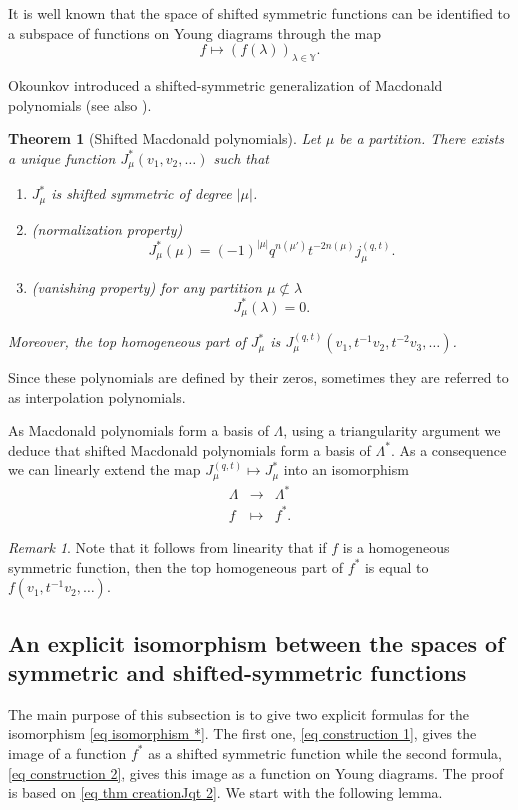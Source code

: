\documentclass[12pt]{amsart}
\newtheorem{thm}{Theorem}[section]
\theoremstyle{remark}
\newtheorem{rmq}{Remark}
\newcommand{\J}{{J}^{(q,t)}}
\newcommand{\Jsh}{{J}^{*}}
\newcommand{\normJ}{{j}^{(q,t)}}
\begin{document}
It is well known that the space of shifted symmetric functions can be identified to a subspace of functions on Young diagrams through the map
$$f\longmapsto (f(\lambda))_{\lambda\in\mathbb Y}.$$ 

Okounkov introduced a shifted-symmetric generalization of Macdonald polynomials (see also \cite{Knop1997b,Sahi1996}).
\begin{thm}[Shifted Macdonald polynomials]\cite{Okounkov1998}\label{thm shifted Macdonald}
Let $\mu$ be a partition.  There exists a unique function  $\Jsh_\mu(v_1,v_2,\dots)$ such that 
\begin{enumerate}
    \item $\Jsh_\mu$ is shifted symmetric of degree $|\mu|$.
    \item (normalization property)
    $$\Jsh_\mu(\mu)=(-1)^{|\mu|}q^{n(\mu')}t^{-2n(\mu)}\normJ_\mu.$$
    \item (vanishing property) for any partition $\mu\not\subset\lambda$
$$\Jsh_\mu(\lambda)=0.$$
\end{enumerate}
Moreover, the top homogeneous part of $J^*_\mu$ is $\J_\mu(v_1,t^{-1}v_2,t^{-2}v_3, \dots)$.
\end{thm}
Since these polynomials are defined by their zeros, sometimes they are referred to as interpolation polynomials.

As Macdonald polynomials form a basis of $\Lambda$, using a triangularity argument we deduce that shifted Macdonald polynomials form a basis of $\Lambda^*$. As a consequence we can linearly extend the map $J^{(q,t)}_\mu\longmapsto J^*_\mu $ into an isomorphism 
\begin{equation}\label{eq isomorphism *}
  \begin{array}{ccc}
     \Lambda &\longrightarrow & \Lambda^* \\
     f &\longmapsto & f^*.   
\end{array}
\end{equation}

\begin{rmq}\label{rmq top hom}
Note that it follows from linearity that if $f$ is a homogeneous symmetric function, then the top homogeneous part of $f^*$ is equal to $f(v_1,t^{-1}v_2,\dots)$.
\end{rmq}

\subsection{An explicit isomorphism between the spaces of symmetric and shifted-symmetric functions}
The main purpose of this subsection is to give two explicit formulas for the isomorphism \cref{eq isomorphism *}. The first one, \cref{eq construction 1}, gives the image of a function $f^*$ as a shifted symmetric function  while the second formula, \cref{eq construction 2}, gives this image as a function on Young diagrams. The proof is based on \cref{eq thm creationJqt 2}.
We start with the following lemma.
\end{document}
